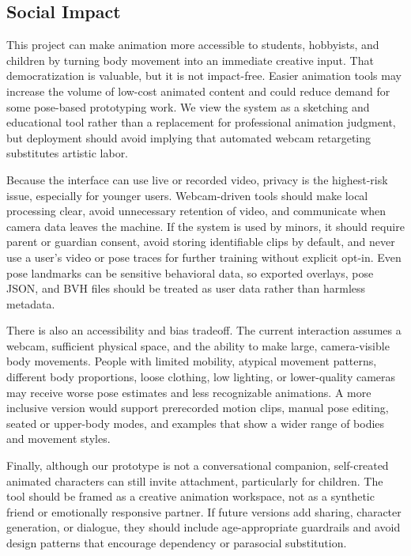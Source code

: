 \documentclass[10pt,twocolumn,letterpaper]{article}
\begin{document}
\subsection{Social Impact}

This project can make animation more accessible to students, hobbyists, and children by turning body movement into an immediate creative input. That democratization is valuable, but it is not impact-free. Easier animation tools may increase the volume of low-cost animated content and could reduce demand for some pose-based prototyping work. We view the system as a sketching and educational tool rather than a replacement for professional animation judgment, but deployment should avoid implying that automated webcam retargeting substitutes artistic labor.

Because the interface can use live or recorded video, privacy is the highest-risk issue, especially for younger users. Webcam-driven tools should make local processing clear, avoid unnecessary retention of video, and communicate when camera data leaves the machine. If the system is used by minors, it should require parent or guardian consent, avoid storing identifiable clips by default, and never use a user's video or pose traces for further training without explicit opt-in. Even pose landmarks can be sensitive behavioral data, so exported overlays, pose JSON, and BVH files should be treated as user data rather than harmless metadata.

There is also an accessibility and bias tradeoff. The current interaction assumes a webcam, sufficient physical space, and the ability to make large, camera-visible body movements. People with limited mobility, atypical movement patterns, different body proportions, loose clothing, low lighting, or lower-quality cameras may receive worse pose estimates and less recognizable animations. A more inclusive version would support prerecorded motion clips, manual pose editing, seated or upper-body modes, and examples that show a wider range of bodies and movement styles.

Finally, although our prototype is not a conversational companion, self-created animated characters can still invite attachment, particularly for children. The tool should be framed as a creative animation workspace, not as a synthetic friend or emotionally responsive partner. If future versions add sharing, character generation, or dialogue, they should include age-appropriate guardrails and avoid design patterns that encourage dependency or parasocial substitution.
\end{document}
